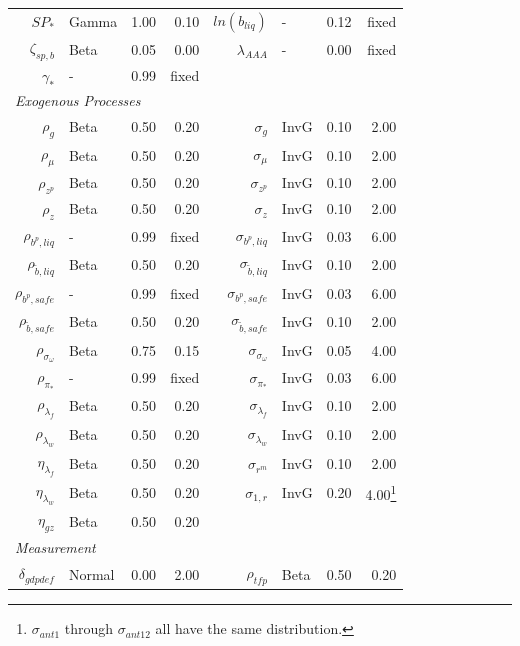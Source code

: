 \documentclass[12pt]{article}
\begin{document}
{\begin{longtable}{rlrr@{\hspace{1in}}rlrr}
$SP_*$ & Gamma & 1.00 & 0.10 & $ln(b_{liq})$ & - & 0.12 & \scriptsize{fixed} \\
$\zeta_{sp,b}$ & Beta & 0.05 & 0.00 & $\lambda_{AAA}$ & - & 0.00 & \scriptsize{fixed} \\
$\gamma_*$ & - & 0.99 & \scriptsize{fixed} && & & \\[3pt]
\multicolumn{8}{l}{\textit{Exogenous Processes}} \\[3pt]
$\rho_g$ & Beta & 0.50 & 0.20 & $\sigma_{g}$ & InvG & 0.10 & 2.00 \\
$\rho_{\mu}$ & Beta & 0.50 & 0.20 & $\sigma_{\mu}$ & InvG & 0.10 & 2.00 \\
$\rho_{z^p}$ & Beta & 0.50 & 0.20 & $\sigma_{z^p}$ & InvG & 0.10 & 2.00 \\
$\rho_z$ & Beta & 0.50 & 0.20 & $\sigma_{z}$ & InvG & 0.10 & 2.00 \\
$\rho_{b^p,liq}$ & - & 0.99 & \scriptsize{fixed} & $\sigma_{b^p, liq}$ & InvG & 0.03 & 6.00 \\
$\rho_{\tilde{b},liq}$ & Beta & 0.50 & 0.20 & $\sigma_{\tilde{b}, liq}$ & InvG & 0.10 & 2.00 \\
$\rho_{b^p,safe}$ & - & 0.99 & \scriptsize{fixed} & $\sigma_{b^p, safe}$ & InvG & 0.03 & 6.00 \\
$\rho_{\tilde{b},safe}$ & Beta & 0.50 & 0.20 & $\sigma_{\tilde{b}, safe}$ & InvG & 0.10 & 2.00 \\
$\rho_{\sigma_\omega}$ & Beta & 0.75 & 0.15 & $\sigma_{\sigma_\omega}$ & InvG & 0.05 & 4.00 \\
$\rho_{\pi_*}$ & - & 0.99 & \scriptsize{fixed} & $\sigma_{\pi_*}$ & InvG & 0.03 & 6.00 \\
$\rho_{\lambda_f}$ & Beta & 0.50 & 0.20 & $\sigma_{\lambda_f}$ & InvG & 0.10 & 2.00 \\
$\rho_{\lambda_w}$ & Beta & 0.50 & 0.20 & $\sigma_{\lambda_w}$ & InvG & 0.10 & 2.00 \\
$\eta_{\lambda_f}$ & Beta & 0.50 & 0.20 & $\sigma_{r^m}$ & InvG & 0.10 & 2.00 \\
$\eta_{\lambda_w}$ & Beta & 0.50 & 0.20 & $\sigma_{1,r}$ & InvG & 0.20 & 4.00\let\thefootnote\relax\footnote{\centering $\sigma_{ant1}$ through $\sigma_{ant12}$ all have the same distribution.} \\
$\eta_{gz}$ & Beta & 0.50 & 0.20 && & & \\[3pt]
\multicolumn{8}{l}{\textit{Measurement}} \\[3pt]
$\delta_{gdpdef}$ & Normal & 0.00 & 2.00 & $\rho_{tfp}$ & Beta & 0.50 & 0.20 \\

\end{longtable}}
\end{document}
